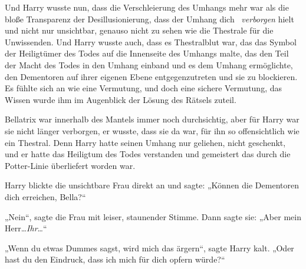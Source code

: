 Und Harry wusste nun, dass die Verschleierung des Umhangs mehr war als die bloße Transparenz der Desillusionierung, dass der Umhang dich ~\emph{verborgen} hielt und nicht nur unsichtbar, genauso nicht zu sehen wie die Thestrale für die Unwissenden. Und Harry wusste auch, dass es Thestralblut war, das das Symbol der Heiligtümer des Todes auf die Innenseite des Umhangs malte, das den Teil der Macht des Todes in den Umhang einband und es dem Umhang ermöglichte, den Dementoren auf ihrer eigenen Ebene entgegenzutreten und sie zu blockieren. Es fühlte sich an wie eine Vermutung, und doch eine sichere Vermutung, das Wissen wurde ihm im Augenblick der Lösung des Rätsels zuteil.

Bellatrix war innerhalb des Mantels immer noch durchsichtig, aber für Harry war sie nicht länger verborgen, er wusste, dass sie da war, für ihn so offensichtlich wie ein Thestral. Denn Harry hatte seinen Umhang nur geliehen, nicht geschenkt, und er hatte das Heiligtum des Todes verstanden und gemeistert das durch die Potter-Linie überliefert worden war.

Harry blickte die unsichtbare Frau direkt an und sagte: „Können die Dementoren dich erreichen, Bella?“

„Nein“, sagte die Frau mit leiser, staunender Stimme. Dann sagte sie: „Aber mein Herr…\emph{Ihr}…“

„Wenn du etwas Dummes sagst, wird mich das ärgern“, sagte Harry kalt. „Oder hast du den Eindruck, dass ich mich für dich opfern würde?“

